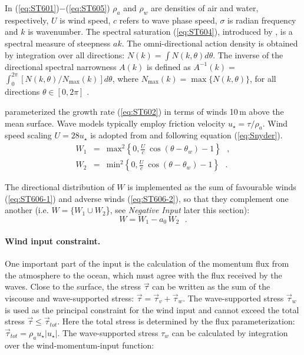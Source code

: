 \noindent
In (\ref{eq:ST601})$-$(\ref{eq:ST605}) $\rho_a$ and $\rho_w$ are densities
of air and water, respectively, $U$ is wind speed, $c$ refers to 
wave phase speed, $\sigma$ is radian frequency and $k$
is wavenumber. The spectral saturation (\ref{eq:ST604}), introduced
by \citet{art:Phi84}, is a spectral measure of steepness $ak$.  The
omni-directional action density is obtained by integration over all directions:
$N(k)=\int N(k,\theta)d\theta$.\linebreak
The inverse of the directional spectral narrowness $A(k)$ is defined as\linebreak
$A^{-1}(k) =$ $\int_{0}^{2\pi} [{N(k,\theta)}/{N_{\max}(k)}] d\theta$,
where $N_{\max}(k)=\max\bigl \{N(k,\theta)\bigr \}$, for all
directions $\theta\in[0,2\pi]$ \citep{art:BS87}.

\citet{art:Dea06} parameterized the growth rate (\ref{eq:ST602}) in terms
of winds 10\,m above the mean surface. Wave models typically employ friction
velocity $u_\star=\tau/\rho_a$. Wind speed scaling $U=28 u_\star$ is adopted 
from \citet{art:Sea81} and \citet{art:KHH84} following equation (\ref{eq:Snyder}).
\begin{eqnarray}
W_1 & = & \mathrm{max}^2 \left \{ 0,\frac{U}{c}\ \cos(\theta-\theta_w)-1
\right \} \:\:\: , \label{eq:ST606-1} \\
W_2 & = & \mathrm{min}^2 \left \{ 0,\frac{U}{c}\ \cos(\theta-\theta_w)-1
\right \} \:\:\: .\label{eq:ST606-2} 
\end{eqnarray}

\noindent
The directional distribution of $W$ is implemented as the sum of favourable
winds (\ref{eq:ST606-1}) and adverse winds (\ref{eq:ST606-2}), so that they
complement one another (i.e. $W=\{W_1\cup W_2$\}, see {\it Negative Input} 
later this section):
\begin{equation}\label{eq:ST606}
W=W_1-a_0\,W_2  \:\:\: .
\end{equation}

\paragraph{Wind input constraint.} One important part of the input is the
calculation of the momentum flux from the atmosphere to the ocean,
which must agree with the flux received by the waves. Close to the surface,
the stress $\vec{\tau}$ can be written as the sum of the viscouse and
wave-supported stress: $\vec{\tau} = \vec{\tau}_{v} + \vec{\tau}_{w}$.
The wave-supported stress $ \vec{\tau}_{w}$ is used as the principal
constraint for the wind input and cannot exceed the total stress
$\vec{\tau} \le \vec{\tau}_{tot}$.  Here the total stress is determined
by the flux parameterization: $\vec{\tau}_{tot}=\rho_a u_\star|u_\star|$.
The wave-supported stress $\tau_w$ can be calculated by integration over
the wind-momentum-input function:

